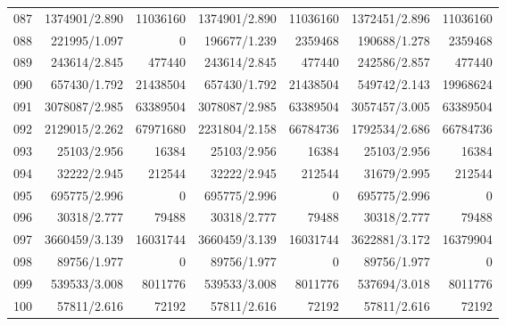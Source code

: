 \begin{longtable}{crrrrrr}
087 & 1374901/2.890 & 11036160 & 1374901/2.890 & 11036160 & 1372451/2.896 & 11036160 \\
088 & 221995/1.097 & 0 & 196677/1.239 & 2359468 & 190688/1.278 & 2359468 \\
089 & 243614/2.845 & 477440 & 243614/2.845 & 477440 & 242586/2.857 & 477440 \\
090 & 657430/1.792 & 21438504 & 657430/1.792 & 21438504 & 549742/2.143 & 19968624 \\
091 & 3078087/2.985 & 63389504 & 3078087/2.985 & 63389504 & 3057457/3.005 & 63389504 \\
092 & 2129015/2.262 & 67971680 & 2231804/2.158 & 66784736 & 1792534/2.686 & 66784736 \\
093 & 25103/2.956 & 16384 & 25103/2.956 & 16384 & 25103/2.956 & 16384 \\
094 & 32222/2.945 & 212544 & 32222/2.945 & 212544 & 31679/2.995 & 212544 \\
095 & 695775/2.996 & 0 & 695775/2.996 & 0 & 695775/2.996 & 0 \\
096 & 30318/2.777 & 79488 & 30318/2.777 & 79488 & 30318/2.777 & 79488 \\
097 & 3660459/3.139 & 16031744 & 3660459/3.139 & 16031744 & 3622881/3.172 & 16379904 \\
098 & 89756/1.977 & 0 & 89756/1.977 & 0 & 89756/1.977 & 0 \\
099 & 539533/3.008 & 8011776 & 539533/3.008 & 8011776 & 537694/3.018 & 8011776 \\
100 & 57811/2.616 & 72192 & 57811/2.616 & 72192 & 57811/2.616 & 72192 \\
\end{longtable}

